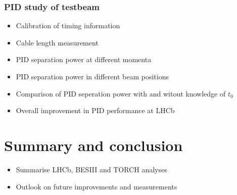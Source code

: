 \documentclass[12pt, a4paper, notitlepage, onecolumn]{article}
\begin{document}
\subsubsection{PID study of testbeam}
  \begin{itemize}[nosep]
    \setlength{\itemindent}{2.5em}
    \item[\textasteriskcentered]{Calibration of timing information}
    \item[\textasteriskcentered]{Cable length measurement}
    \item[\textasteriskcentered]{PID separation power at different momenta}
    \item[\textasteriskcentered]{PID separation power in different beam positions}
    \item[\textasteriskcentered]{Comparison of PID seperation power with and witout knowledge of $t_0$}
    \item[\textasteriskcentered]{Overall improvement in PID performance at LHCb}
  \end{itemize}

\section{Summary and conclusion}
  \begin{itemize}[nosep]
    \setlength{\itemindent}{0em}
    \item{Summarise LHCb, BESIII and TORCH analyses}
    \item{Outlook on future improvements and measurements}
  \end{itemize}
\end{document}
